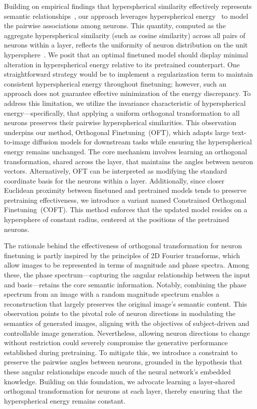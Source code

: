 Building on empirical findings that hyperspherical similarity effectively represents semantic relationships~\cite{liu2017deep,liu2018decoupled,chen2020angular}, our approach leverages hyperspherical energy~\cite{liu2018learning} to model the pairwise associations among neurons. This quantity, computed as the aggregate hyperspherical similarity (such as cosine similarity) across all pairs of neurons within a layer, reflects the uniformity of neuron distribution on the unit hypersphere~\cite{liu2021learning}. We posit that an optimal finetuned model should display minimal alteration in hyperspherical energy relative to its pretrained counterpart. One straightforward strategy would be to implement a regularization term to maintain consistent hyperspherical energy throughout finetuning; however, such an approach does not guarantee effective minimization of the energy discrepancy. To address this limitation, we utilize the invariance characteristic of hyperspherical energy—specifically, that applying a uniform orthogonal transformation to all neurons preserves their pairwise hyperspherical similarities. This observation underpins our method, Orthogonal Finetuning~(OFT), which adapts large text-to-image diffusion models for downstream tasks while ensuring the hyperspherical energy remains unchanged. The core mechanism involves learning an orthogonal transformation, shared across the layer, that maintains the angles between neuron vectors. Alternatively, OFT can be interpreted as modifying the standard coordinate basis for the neurons within a layer. Additionally, since closer Euclidean proximity between finetuned and pretrained models tends to preserve pretraining effectiveness, we introduce a variant named Constrained Orthogonal Finetuning~(COFT). This method enforces that the updated model resides on a hypersphere of constant radius, centered at the positions of the pretrained neurons.

The rationale behind the effectiveness of orthogonal transformation for neuron finetuning is partly inspired by the principles of 2D Fourier transforms, which allow images to be represented in terms of magnitude and phase spectra. Among these, the phase spectrum—capturing the angular relationship between the input and basis—retains the core semantic information. Notably, combining the phase spectrum from an image with a random magnitude spectrum enables a reconstruction that largely preserves the original image’s semantic content. This observation points to the pivotal role of neuron directions in modulating the semantics of generated images, aligning with the objectives of subject-driven and controllable image generation. Nevertheless, allowing neuron directions to change without restriction could severely compromise the generative performance established during pretraining. To mitigate this, we introduce a constraint to preserve the pairwise angles between neurons, grounded in the hypothesis that these angular relationships encode much of the neural network's embedded knowledge. Building on this foundation, we advocate learning a layer-shared orthogonal transformation for neurons at each layer, thereby ensuring that the hyperspherical energy remains constant.

